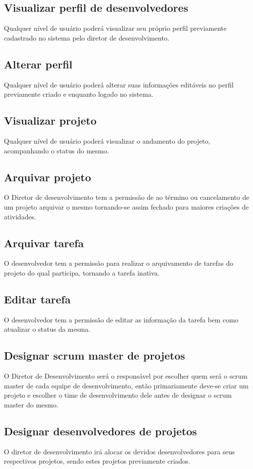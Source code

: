 \subsection{Visualizar perfil de desenvolvedores}
  Qualquer nível de usuário poderá visualizar seu próprio perfil previamente cadastrado no sistema pelo diretor de desenvolvimento.
\subsection{Alterar perfil}
  Qualquer nível de usuário poderá alterar suas informações editáveis no perfil previamente criado e enquanto logado no sistema.
\subsection{Visualizar projeto}
  Qualquer nível de usuário poderá visualizar o andamento do projeto, acompanhando o status do mesmo.
\subsection{Arquivar projeto}
  O Diretor de desenvolvimento tem a permissão de ao término ou cancelamento de um projeto arquivar o mesmo tornando-se assim fechado para maiores criações de atividades.
\subsection{Arquivar tarefa}
  O desenvolvedor tem a permissão para realizar o arquivamento de tarefas do projeto do qual participa, tornando a tarefa inativa.
\subsection{Editar tarefa}
  O desenvolvedor tem a permissão de editar as informação da tarefa bem como atualizar o status da mesma.
\subsection{Designar scrum master de projetos}
  O Diretor de Desenvolvimento será o responsável por escolher quem será o scrum master de cada equipe de desenvolvimento, então primariamente deve-se criar um projeto e escolher o time de desenvolvimento dele antes de designar o scrum master do mesmo.
\subsection{Designar desenvolvedores de projetos}
  O diretor de desenvolvimento irá alocar os devidos desenvolvedores para seus respectivos projetos, sendo estes projetos previamente criados.

